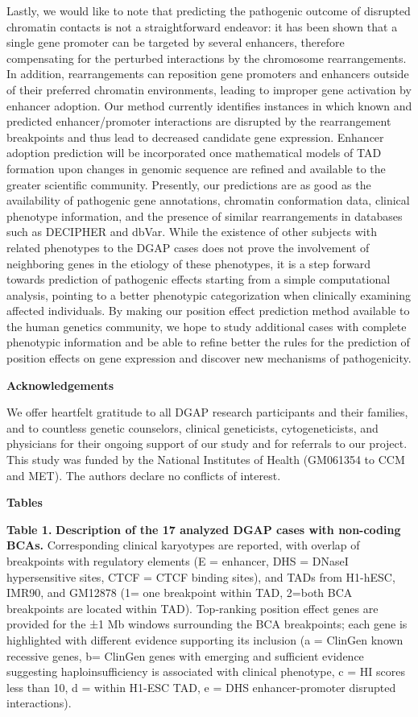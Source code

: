 \documentclass[a4paper,twoside=true,openright,parskip=full,chapterprefix=true,11pt,headings=normal,bibliography=totoc,listof=totoc,titlepage=on,captions=tableabove,draft=false]{scrreprt}
\theoremstyle{definition}
\theoremstyle{definition}
\theoremstyle{definition}
\theoremstyle{remark}
\begin{document}
Lastly, we would like to note that predicting the pathogenic outcome of
disrupted chromatin contacts is not a straightforward endeavor: it has
been shown that a single gene promoter can be targeted by several
enhancers,\citep{Thurman2012} therefore compensating for the perturbed
interactions by the chromosome rearrangements. In addition,
rearrangements can reposition gene promoters and enhancers outside of
their preferred chromatin environments, leading to improper gene
activation by enhancer adoption.\citep{Lupianez2015} Our method
currently identifies instances in which known and predicted
enhancer/promoter interactions are disrupted by the rearrangement
breakpoints and thus lead to decreased candidate gene expression.
Enhancer adoption prediction will be incorporated once mathematical
models of TAD formation upon changes in genomic sequence are refined and
available to the greater scientific community. Presently, our
predictions are as good as the availability of pathogenic gene
annotations, chromatin conformation data, clinical phenotype
information, and the presence of similar rearrangements in databases
such as DECIPHER and dbVar. While the existence of other subjects with
related phenotypes to the DGAP cases does not prove the involvement of
neighboring genes in the etiology of these phenotypes, it is a step
forward towards prediction of pathogenic effects starting from a simple
computational analysis, pointing to a better phenotypic categorization
when clinically examining affected individuals. By making our position
effect prediction method available to the human genetics community, we
hope to study additional cases with complete phenotypic information and
be able to refine better the rules for the prediction of position
effects on gene expression and discover new mechanisms of pathogenicity.

\textbf{Acknowledgements}

We offer heartfelt gratitude to all DGAP research participants and their
families, and to countless genetic counselors, clinical geneticists,
cytogeneticists, and physicians for their ongoing support of our study
and for referrals to our project. This study was funded by the National
Institutes of Health (GM061354 to CCM and MET). The authors declare no
conflicts of interest.

\textbf{Tables}

\textbf{Table 1.} \textbf{Description of the 17 analyzed DGAP cases with
non-coding BCAs.} Corresponding clinical karyotypes are reported, with
overlap of breakpoints with regulatory elements (E = enhancer, DHS =
DNaseI hypersensitive sites, CTCF = CTCF binding sites), and TADs from
H1-hESC, IMR90, and GM12878 (1= one breakpoint within TAD, 2=both BCA
breakpoints are located within TAD). Top-ranking position effect genes
are provided for the ±1 Mb windows surrounding the BCA breakpoints; each
gene is highlighted with different evidence supporting its inclusion (a
= ClinGen known recessive genes, b= ClinGen genes with emerging and
sufficient evidence suggesting haploinsufficiency is associated with
clinical phenotype, c = HI scores less than 10, d = within H1-ESC TAD, e
= DHS enhancer-promoter disrupted interactions).
\end{document}
